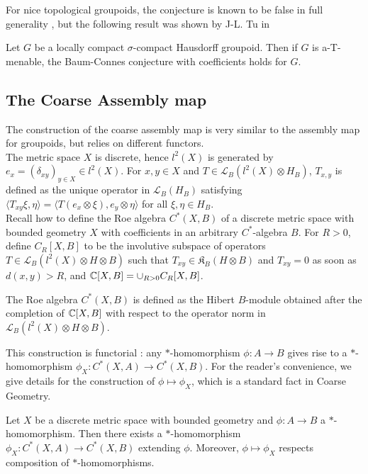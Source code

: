 For nice topological groupoids, the conjecture is known to be false in full generality \cite{HigsonLaffSk}, but the following result was shown by J-L. Tu in \cite{TuThese}
\begin{thm}\label{Tu}
Let $G$ be a locally compact $\sigma$-compact Hausdorff groupoid. Then if $G$ is a-T-menable, the Baum-Connes conjecture with coefficients holds for $G$.
\end{thm}

\subsection{The Coarse Assembly map}

The construction of the coarse assembly map is very similar to the assembly map for groupoids, but relies on different functors.\\

The metric space $X$ is discrete, hence $l^2(X)$ is generated by $e_x = (\delta_{xy})_{y\in X}\in l^2(X)$. For $x,y\in X$ and $T\in \mathcal L_B(l^2(X)\otimes H_B)$, $T_{x,y}$ is defined as the unique operator in $\mathcal L_B(H_B)$ satisfying $\langle T_{xy}\xi,\eta\rangle = \langle T (e_x\otimes \xi),e_y\otimes \eta \rangle$ for all $\xi,\eta\in H_B$.\\

Recall how to define the Roe algebra $C^*(X,B)$ of a discrete metric space with bounded geometry $X$ with coefficients in an arbitrary $C^*$-algebra $B$. For $R>0$, define $C_R[X,B]$ to be the involutive subspace of operators $T\in \mathcal L_B(l^2(X)\otimes H\otimes B)$ such that $T_{xy}\in \mathfrak K_B(H\otimes B)$ and $T_{xy}=0$ as soon as $d(x,y)>R$, and $\mathbb C[X,B]= \cup_{R>0} C_R[X,B]$. 

\begin{definition}
The Roe algebra $C^*(X,B)$ is defined as the Hibert $B$-module obtained after the completion of $\mathbb C[X,B]$ with respect to the operator norm in $\mathcal L_B(l^2(X)\otimes H\otimes B)$.
\end{definition} 
This construction is functorial : any $*$-homomorphism $\phi: A\rightarrow B$ gives rise to a $*$-homomorphism $\phi_X : C^*(X,A)\rightarrow C^*(X,B)$. For the reader's convenience, we give details for the construction of $\phi\mapsto \phi_X$, which is a standard fact in Coarse Geometry.

\begin{thm}\label{Xfunctor}
Let $X$ be a discrete metric space with bounded geometry and $\phi : A\rightarrow B$ a $*$-homomorphism. Then there exists a $*$-homomorphism $\phi_X : C^*(X,A)\rightarrow C^*(X,B)$ extending $\phi$. Moreover, $\phi\mapsto \phi_X$ respects composition of $*$-homomorphisms.
\end{thm}

